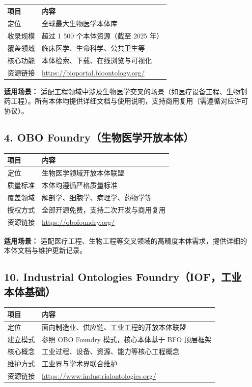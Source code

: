 \begin{center}
\begin{tabular}{@{}ll@{}}
\toprule
\textbf{项目} & \textbf{内容} \\
\midrule
定位 & 全球最大生物医学本体库 \\
收录规模 & 超过 1 500 个本体资源（截至 2025 年） \\
覆盖领域 & 临床医学、生命科学、公共卫生等 \\
核心功能 & 本体检索、下载、在线浏览与可视化 \\
资源链接 & \url{https://bioportal.bioontology.org/} \\
\bottomrule
\end{tabular}
\end{center}
\color{black}

\textbf{适用场景：} 适配工程领域中涉及生物医学交叉的场景（如医疗设备工程、生物制药工程）。所有本体均提供详细文档与使用说明，支持商用复用（需遵循对应许可协议）。


\subsection{4. OBO Foundry（生物医学开放本体）}

\begin{center}
\begin{tabular}{@{}ll@{}}
\toprule
\textbf{项目} & \textbf{内容} \\
\midrule
定位 & 生物医学领域开放本体联盟 \\
质量标准 & 本体均遵循严格质量标准 \\
覆盖领域 & 解剖学、细胞学、病理学、药物学等 \\
授权方式 & 全部开源免费，支持二次开发与商用复用 \\
资源链接 & \url{https://obofoundry.org/} \\
\bottomrule
\end{tabular}
\end{center}
\color{black}

\textbf{适用场景：} 适配医疗工程、生物工程等交叉领域的高精度本体需求，提供详细的本体文档与维护更新记录。


\subsection{10. Industrial Ontologies Foundry（IOF，工业本体基础）}

\begin{center}
\begin{tabular}{@{}ll@{}}
\toprule
\textbf{项目} & \textbf{内容} \\
\midrule
定位 & 面向制造业、供应链、工业工程的开放本体联盟 \\
建立模式 & 参照 OBO Foundry 模式，核心本体基于 BFO 顶层框架 \\
核心概念 & 工业过程、设备、资源、能力等核心工程概念 \\
维护方式 & 工业界与学术界联合维护 \\
资源链接 & \url{https://www.industrialontologies.org/} \\
\bottomrule
\end{tabular}
\end{center}
\color{black}

